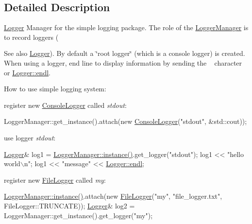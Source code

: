 \subsection{Detailed Description}
\hyperlink{classez_1_1logging_1_1Logger}{Logger} Manager for the simple logging package. The role of the \hyperlink{classez_1_1logging_1_1LoggerManager}{Logger\+Manager} is to record loggers (\begin{DoxySeeAlso}{See also}
\hyperlink{classez_1_1logging_1_1Logger}{Logger}). By default a \char`\"{}root logger\char`\"{} (which is a console logger) is created. When using a logger, end line to display information by sending the \textquotesingle{}~\newline
\textquotesingle{} character or \hyperlink{classez_1_1logging_1_1Logger_a69ba6cf7130aa70caeca9f5c8636e05a}{Logger\+::endl}.
\end{DoxySeeAlso}
How to use simple logging system\+: 
\begin{DoxyItemize}
\item register new \hyperlink{classez_1_1logging_1_1ConsoleLogger}{Console\+Logger} called {\itshape stdout}\+: 
\begin{DoxyPre}{\ttfamily 
LoggerManager::get\_instance().attach(new \hyperlink{classez_1_1logging_1_1ConsoleLogger}{ConsoleLogger}("stdout", \&std::cout));
}\end{DoxyPre}
  
\item use logger {\itshape stdout}\+: 
\begin{DoxyPre}{\ttfamily 
\hyperlink{classez_1_1logging_1_1Logger}{Logger}\& log1 = \hyperlink{classez_1_1logging_1_1LoggerManager_a787219c6e31bc575de95127350da7c5a}{LoggerManager::instance()}.get\_logger("stdout");
log1 << "hello world\(\backslash\)n";
log1 << "message" << \hyperlink{classez_1_1logging_1_1Logger_a69ba6cf7130aa70caeca9f5c8636e05a}{Logger::endl};
}\end{DoxyPre}
  
\item register new \hyperlink{classez_1_1logging_1_1FileLogger}{File\+Logger} called {\itshape my}\+: 
\begin{DoxyPre}{\ttfamily 
\hyperlink{classez_1_1logging_1_1LoggerManager_a787219c6e31bc575de95127350da7c5a}{LoggerManager::instance()}.attach(new \hyperlink{classez_1_1logging_1_1FileLogger}{FileLogger}("my", "file\_logger.txt",
FileLogger::TRUNCATE));
    \hyperlink{classez_1_1logging_1_1Logger}{Logger}\& log2 = LoggerManager::get\_instance().get\_logger("my");
    }\end{DoxyPre}
  
\end{DoxyItemize}

